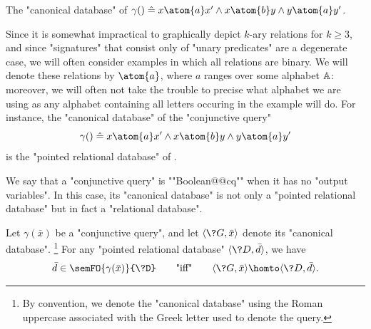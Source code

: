\begin{marginfigure}
	\centering
	\caption{\AP\label{fig:prelim-db-ex-db}
	The "canonical database" of $\gamma() \defeq x \atom{a} x' \land x \atom{b} y \land y \atom{a} y'$.}
\end{marginfigure}
Since it is somewhat impractical to graphically depict $k$-ary relations for $k \geq 3$,
and since "signatures" that consist only of "unary predicates" are a degenerate case,
we will often consider examples in which all relations are binary.
We will denote these relations by $\atom{a}$, where $a$ ranges over some alphabet $\mathbb{A}$:
moreover, we will often not take the trouble to precise what alphabet we are using
as any alphabet containing all letters occuring in the example will do.
For instance, the "canonical database" of the "conjunctive query"
\[
	\gamma() \defeq x \atom{a} x' \land x \atom{b} y \land y \atom{a} y'
\]
is the "pointed relational database" of .

We say that a "conjunctive query" is ""Boolean@@cq"" when it has no "output variables".
In this case, its "canonical database" is not only a "pointed relational database" but
in fact a "relational database".

\begin{proposition}[""Duality""]
	\AP\label{prop:duality}
	Let $\gamma(\bar x)$ be a "conjunctive query",
	and let $\tup{\?G, \bar x}$ denote its "canonical database".%
	\footnote{By convention, we denote the "canonical database" using the Roman
	uppercase associated with the Greek letter used to denote
	the query.}
	For any "pointed relational database" $\tup{\?D, \bar d}$,
	we have
	\[
		\bar d \in \semFO{\gamma(\bar x)}{\?D}
		\qquad\text{"iff"}\qquad
		\tup{\?G, \bar x} \homto \tup{\?D, \bar d}.
	\]
\end{proposition}

